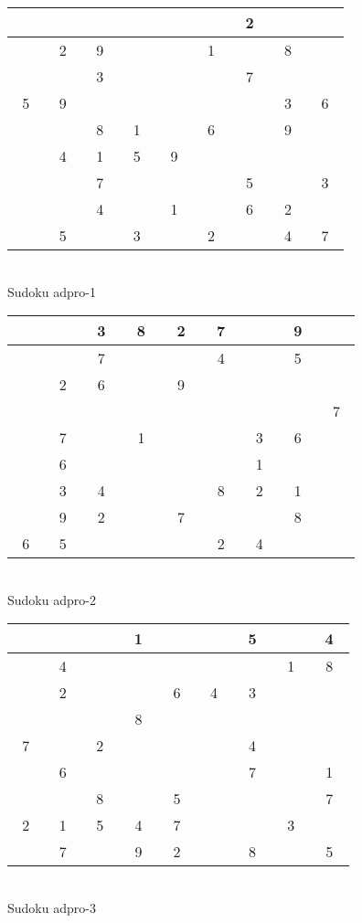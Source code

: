 \documentclass[12pt,a4paper]{article}
\begin{document}
\renewcommand{\familydefault}{\sfdefault}
\Large\sf
\begin{center}
\begin{tabular}{||c|c|c||c|c|c||c|c|c||}\hline\hline
~ ~&~ ~&~ ~&~ ~&~ ~&~ ~&~2~&~ ~&~ ~\\\hline
~ ~&~2~&~9~&~ ~&~ ~&~1~&~ ~&~8~&~ ~\\\hline
~ ~&~ ~&~3~&~ ~&~ ~&~ ~&~7~&~ ~&~ ~\\\hline
\hline
~5~&~9~&~ ~&~ ~&~ ~&~ ~&~ ~&~3~&~6~\\\hline
~ ~&~ ~&~8~&~1~&~ ~&~6~&~ ~&~9~&~ ~\\\hline
~ ~&~4~&~1~&~5~&~9~&~ ~&~ ~&~ ~&~ ~\\\hline
\hline
~ ~&~ ~&~7~&~ ~&~ ~&~ ~&~5~&~ ~&~3~\\\hline
~ ~&~ ~&~4~&~ ~&~1~&~ ~&~6~&~2~&~ ~\\\hline
~ ~&~5~&~ ~&~3~&~ ~&~2~&~ ~&~4~&~7~\\\hline
\hline\end{tabular}\\[1.5ex]
Sudoku adpro-1
\end{center}
\vfill
\begin{center}
\begin{tabular}{||c|c|c||c|c|c||c|c|c||}\hline\hline
~ ~&~ ~&~3~&~8~&~2~&~7~&~ ~&~9~&~ ~\\\hline
~ ~&~ ~&~7~&~ ~&~ ~&~4~&~ ~&~5~&~ ~\\\hline
~ ~&~2~&~6~&~ ~&~9~&~ ~&~ ~&~ ~&~ ~\\\hline
\hline
~ ~&~ ~&~ ~&~ ~&~ ~&~ ~&~ ~&~ ~&~7~\\\hline
~ ~&~7~&~ ~&~1~&~ ~&~ ~&~3~&~6~&~ ~\\\hline
~ ~&~6~&~ ~&~ ~&~ ~&~ ~&~1~&~ ~&~ ~\\\hline
\hline
~ ~&~3~&~4~&~ ~&~ ~&~8~&~2~&~1~&~ ~\\\hline
~ ~&~9~&~2~&~ ~&~7~&~ ~&~ ~&~8~&~ ~\\\hline
~6~&~5~&~ ~&~ ~&~ ~&~2~&~4~&~ ~&~ ~\\\hline
\hline\end{tabular}\\[1.5ex]
Sudoku adpro-2
\end{center}
\vfill
\begin{center}
\begin{tabular}{||c|c|c||c|c|c||c|c|c||}\hline\hline
~ ~&~ ~&~ ~&~1~&~ ~&~ ~&~5~&~ ~&~4~\\\hline
~ ~&~4~&~ ~&~ ~&~ ~&~ ~&~ ~&~1~&~8~\\\hline
~ ~&~2~&~ ~&~ ~&~6~&~4~&~3~&~ ~&~ ~\\\hline
\hline
~ ~&~ ~&~ ~&~8~&~ ~&~ ~&~ ~&~ ~&~ ~\\\hline
~7~&~ ~&~2~&~ ~&~ ~&~ ~&~4~&~ ~&~ ~\\\hline
~ ~&~6~&~ ~&~ ~&~ ~&~ ~&~7~&~ ~&~1~\\\hline
\hline
~ ~&~ ~&~8~&~ ~&~5~&~ ~&~ ~&~ ~&~7~\\\hline
~2~&~1~&~5~&~4~&~7~&~ ~&~ ~&~3~&~ ~\\\hline
~ ~&~7~&~ ~&~9~&~2~&~ ~&~8~&~ ~&~5~\\\hline
\hline\end{tabular}\\[1.5ex]
Sudoku adpro-3
\end{center}
\end{document}
